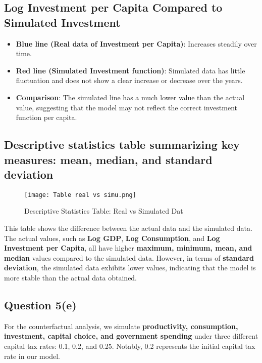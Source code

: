 \documentclass{article}
\begin{document}
\subsection*{Log Investment per Capita Compared to Simulated Investment}
\begin{itemize}
    \item \textbf{Blue line (Real data of Investment per Capita)}: Increases steadily over time.
    \item \textbf{Red line (Simulated Investment function)}: Simulated data has little fluctuation and does not show a clear increase or decrease over the years.
    \item \textbf{Comparison}: The simulated line has a much lower value than the actual value, suggesting that the model may not reflect the correct investment function per capita.
\end{itemize}


\subsection*{Descriptive statistics table summarizing key measures: mean, median, and standard deviation}
\begin{figure}[H]
    \centering
    \texttt{[image: Table real vs simu.png]}
    \caption{Descriptive Statistics Table: Real vs Simulated Dat}
    \label{fig:gdp}
\end{figure}
This table shows the difference between the actual data and the simulated data. The actual values, such as \textbf{Log GDP}, \textbf{Log Consumption}, and \textbf{Log Investment per Capita}, all have higher \textbf{maximum, minimum, mean, and median} values compared to the simulated data. However, in terms of \textbf{standard deviation}, the simulated data exhibits lower values, indicating that the model is more stable than the actual data obtained.
\subsection*{Question 5(e)}
For the counterfactual analysis, we simulate \textbf{productivity, consumption, investment, capital choice, and government spending} under three different capital tax rates: 0.1, 0.2, and 0.25. Notably, 0.2 represents the initial capital tax rate in our model.
\end{document}
